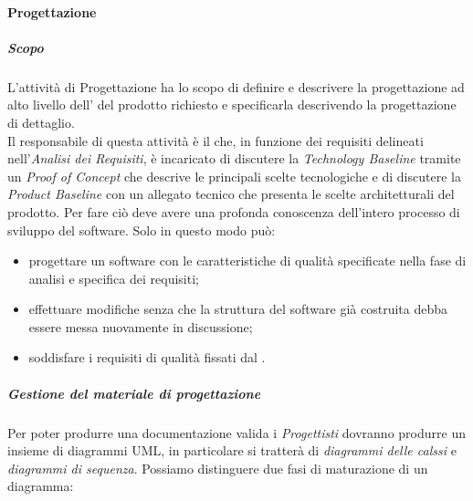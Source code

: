		\paragraph{Progettazione}
			\label{sec:progettazione}
			\subparagraph{Scopo}
			\Spazio
			L'attività di Progettazione ha lo scopo di definire e descrivere la progettazione ad alto livello dell' del prodotto richiesto e specificarla descrivendo la progettazione di dettaglio. \\
			Il responsabile di questa attività è il \emph{} che, in funzione dei requisiti delineati nell'\textit{Analisi dei Requisiti}, è incaricato di discutere la \textit{Technology Baseline} tramite un \textit{Proof of Concept} che descrive le principali scelte tecnologiche e di discutere la \textit{Product Baseline} con un allegato tecnico che presenta le scelte architetturali del prodotto.
			Per fare ciò deve avere una profonda conoscenza dell'intero processo di sviluppo del software.
			Solo in questo modo può:
			\begin{itemize}
				\item progettare un software con le caratteristiche di qualità specificate nella fase di analisi e specifica dei requisiti;
				\item effettuare modifiche senza che la struttura del software già costruita debba essere messa nuovamente in discussione;
				\item soddisfare i requisiti di qualità fissati dal .
			\end{itemize}



			\subparagraph{Gestione del materiale di progettazione}
			\label{sec:gestioneMaterialeProgettazione}
			\Spazio
			Per poter produrre una documentazione valida i \emph{Progettisti} dovranno produrre un insieme di diagrammi UML, in particolare si tratterà di \emph{diagrammi delle calssi} e \emph{diagrammi di sequenza}. Possiamo distinguere due fasi di maturazione di un diagramma:
			
